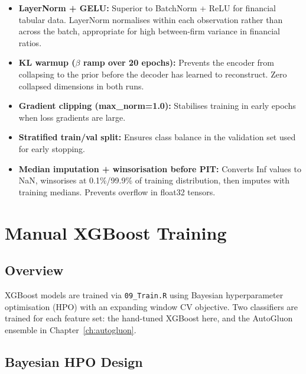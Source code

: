 \documentclass{report}\usepackage[]{graphicx}\usepackage[table]{xcolor}
\begin{document}
\begin{itemize}
    \item \textbf{LayerNorm + GELU:} Superior to BatchNorm + ReLU for financial tabular 
    data. LayerNorm normalises within each observation rather than across the batch, 
    appropriate for high between-firm variance in financial ratios.
    
    \item \textbf{KL warmup ($\beta$ ramp over 20 epochs):} Prevents the encoder from 
    collapsing to the prior before the decoder has learned to reconstruct. 
    Zero collapsed dimensions in both runs.
    
    \item \textbf{Gradient clipping (max\_norm=1.0):} Stabilises training in 
    early epochs when loss gradients are large.
    
    \item \textbf{Stratified train/val split:} Ensures class balance in the 
    validation set used for early stopping.
    
    \item \textbf{Median imputation + winsorisation before PIT:} Converts Inf values 
    to NaN, winsorises at 0.1\%/99.9\% of training distribution, then imputes with 
    training medians. Prevents overflow in float32 tensors.
\end{itemize}

\chapter{Manual XGBoost Training}
\label{ch:xgboost}

\section{Overview}

XGBoost models are trained via \texttt{09\_Train.R} using Bayesian hyperparameter 
optimisation (HPO) with an expanding window CV objective. Two classifiers are 
trained for each feature set: the hand-tuned XGBoost here, and the AutoGluon 
ensemble in Chapter~\ref{ch:autogluon}.

\section{Bayesian HPO Design}
\end{document}
